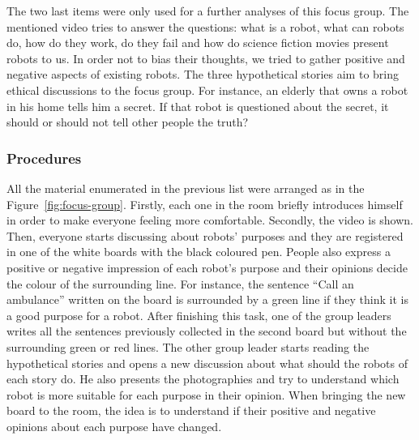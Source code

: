The two last items were only used for a further analyses of this focus group.
The mentioned video tries to answer the questions: what is a robot, what can robots do, how do they work, do they fail and how do science fiction movies present robots to us.
In order not to bias their thoughts, we tried to gather positive and negative aspects of existing robots.
The three hypothetical stories aim to bring ethical discussions to the focus group.
For instance, an elderly that owns a robot in his home tells him a secret.
If that robot is questioned about the secret, it should or should not tell other people the truth?

\subsubsection{Procedures}
All the material enumerated in the previous list were arranged as in the Figure~\ref{fig:focus-group}.
Firstly, each one in the room briefly introduces himself in order to make everyone feeling more comfortable.
Secondly, the video is shown.
Then, everyone starts discussing about robots' purposes and they are registered in one of the white boards with the black coloured pen.
People also express a positive or negative impression of each robot's purpose and their opinions decide the colour of the surrounding line.
For instance, the sentence ``Call an ambulance'' written on the board is surrounded by a green line if they think it is a good purpose for a robot.
After finishing this task, one of the group leaders writes all the sentences previously collected in the second board but without the surrounding green or red lines.
The other group leader starts reading the hypothetical stories and opens a new discussion about what should the robots of each story do.
He also presents the photographies and try to understand which robot is more suitable for each purpose in their opinion.
When bringing the new board to the room, the idea is to understand if their positive and negative opinions about each purpose have changed.

